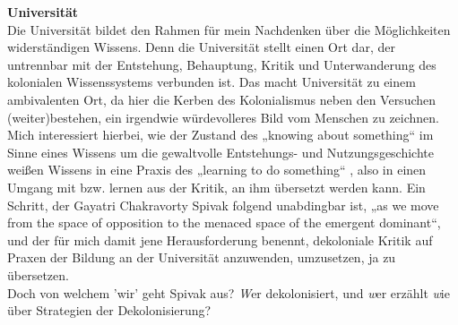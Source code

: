 \noindent\textbf{\large Universität}\\
Die Universität bildet den Rahmen für mein Nachdenken über die Möglichkeiten
widerständigen Wissens. Denn die Universität stellt einen Ort dar, der
untrennbar mit der Entstehung, Behauptung, Kritik und Unterwanderung des
kolonialen Wissenssystems verbunden ist.\footnotemark{}
Das macht Universität zu einem ambivalenten Ort, da hier die Kerben des
Kolonialismus neben den Versuchen (weiter)bestehen, ein irgendwie würdevolleres
Bild vom Menschen zu zeichnen.\\
Mich interessiert hierbei, wie der Zustand des „knowing about
something“\footnotemark {} im
Sinne eines Wissens um die gewaltvolle Entstehungs- und Nutzungsgeschichte
weißen Wissens in eine Praxis des „learning to do something“\footnotemark
{}, also in einen Umgang mit bzw. lernen aus der Kritik, an
ihm übersetzt werden kann. Ein Schritt, der Gayatri Chakravorty Spivak folgend
unabdingbar ist, „as we move from the space of opposition to the menaced space
of the emergent dominant“\footnotemark{}, und der für mich damit jene Herausforderung
benennt, dekoloniale Kritik auf Praxen der Bildung an der Universität
anzuwenden, umzusetzen, ja zu übersetzen.\\
Doch von welchem 'wir' geht Spivak
aus? \textit{W}er dekolonisiert, und \textit{w}er erzählt \textit{w}ie über Strategien der
Dekolonisierung?\\

